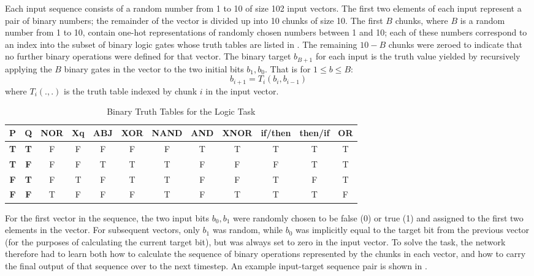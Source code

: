 \documentclass[10pt]{article}
\newcommand{\tlabel}[1]{\label{tab:#1}}
\newcommand{\elabel}[1]{\label{eq:#1}}
\newcommand{\fref}[1]{\Cref{fig:#1}}
\newcommand{\tref}[1]{\Cref{tab:#1}}
\begin{document}
Each input sequence consists of a random number from 1 to 10 of size 102 input vectors.
The first two elements of each input represent a pair of binary numbers; the remainder of the vector is divided up into 10 chunks of size 10.
The first $B$ chunks, where $B$ is a random number from 1 to 10, contain one-hot representations of randomly chosen numbers between 1 and 10; each of these numbers correspond to an index into the subset of binary logic gates whose truth tables are listed in \tref{truth}.
The remaining $10-B$ chunks were zeroed to indicate that no further binary operations were defined for that vector.
The binary target $b_{B+1}$ for each input is the truth value yielded by recursively applying the $B$ binary gates in the vector to the two initial bits $b_{1},b_{0}$. That is for $1\leq b\leq B$:
\begin{equation}\elabel{logic}
b_{i+1} = T_i(b_{i},b_{i-1}) 
\end{equation}
where $T_i(.,.)$ is the truth table indexed by chunk $i$ in the input vector.

\begin{table}
\centering
\begin{footnotesize}
\centering
\caption{Binary Truth Tables for the Logic Task}
\medskip
\tlabel{truth}
\begin{tabular}{|cc|c|c|c|c|c|c|c|c|c|c|}
\hline
\textbf{P} & \textbf{Q} & \textbf{NOR} & \textbf{Xq} & \textbf{ABJ} & \textbf{XOR} & \textbf{NAND} & \textbf{AND} & \textbf{XNOR} & \textbf{if/then} & \textbf{then/if} & \textbf{OR}\\
\hline
\textbf{T} & \textbf{T} & F & F & F & F & F & T & T & T & T & T \\
\textbf{T} & \textbf{F} & F & F & T & T & T & F & F & F & T & T \\
\textbf{F} & \textbf{T} & F & T & F & T & T & F & F & T & F & T \\
\textbf{F} & \textbf{F} & T & F & F & F & T & F & T & T & T & F \\
\hline
\end{tabular}
\end{footnotesize}
\end{table}

For the first vector in the sequence, the two input bits $b_0,b_1$ were randomly chosen to be false (0) or true (1) and assigned to the first two elements in the vector.
For subsequent vectors, only $b_1$ was random, while $b_0$ was implicitly equal to the target bit from the previous vector (for the purposes of calculating the current target bit), but was always set to zero in the input vector.
To solve the task, the network therefore had to learn both how to calculate the sequence of binary operations represented by the chunks in each vector, and how to carry the final output of that sequence over to the next timestep. 
An example input-target sequence pair is shown in \fref{logic_example}.
\end{document}

